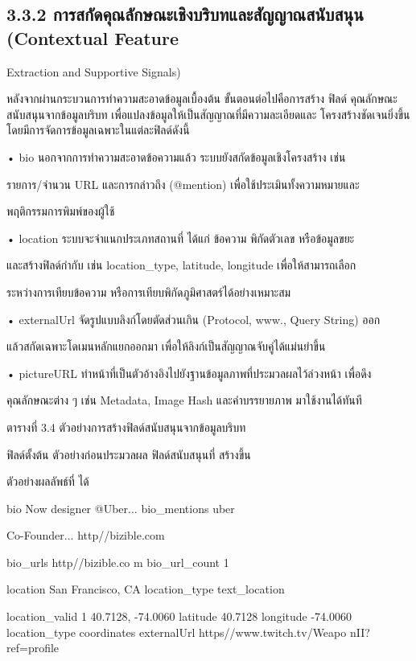 \documentclass[12pt,a4paper]{report}
\begin{document}
\subsection*{3.3.2 การสกัดคุณลักษณะเชิงบริบทและสัญญาณสนับสนุน (Contextual Feature}
Extraction and Supportive Signals)\par
หลังจากผ่านกระบวนการทำความสะอาดข้อมูลเบื้องต้น ขั้นตอนต่อไปคือการสร้าง ฟิลด์ คุณลักษณะสนับสนุนจากข้อมูลบริบท เพื่อแปลงข้อมูลให้เป็นสัญญาณที่มีความละเอียดและ โครงสร้างชัดเจนยิ่งขึ้น โดยมีการจัดการข้อมูลเฉพาะในแต่ละฟิลด์ดังนี้\par
\noindent • bio นอกจากการทำความสะอาดข้อความแล้ว ระบบยังสกัดข้อมูลเชิงโครงสร้าง เช่น\par
รายการ/จำนวน URL และการกล่าวถึง (@mention) เพื่อใช้ประเมินทั้งความหมายและ\par
พฤติกรรมการพิมพ์ของผู้ใช้\par
\noindent • location ระบบจะจำแนกประเภทสถานที่ ได้แก่ ข้อความ พิกัดตัวเลข หรือข้อมูลขยะ\par
และสร้างฟิลด์กำกับ เช่น location\_type, latitude, longitude เพื่อให้สามารถเลือก\par
ระหว่างการเทียบข้อความ หรือการเทียบพิกัดภูมิศาสตร์ได้อย่างเหมาะสม\par
\noindent • externalUrl จัดรูปแบบลิงก์โดยตัดส่วนเกิน (Protocol, www., Query String) ออก\par
แล้วสกัดเฉพาะโดเมนหลักแยกออกมา เพื่อให้ลิงก์เป็นสัญญาณจับคู่ได้แม่นยำขึ้น\par
\noindent • pictureURL ทำหน้าที่เป็นตัวอ้างอิงไปยังฐานข้อมูลภาพที่ประมวลผลไว้ล่วงหน้า เพื่อดึง\par
คุณลักษณะต่าง ๆ เช่น Metadata, Image Hash และคำบรรยายภาพ มาใช้งานได้ทันที\par
\begin{center}\small ตารางที่ 3.4 ตัวอย่างการสร้างฟิลด์สนับสนุนจากข้อมูลบริบท\end{center}
\clearpage
ฟิลด์ตั้งต้น ตัวอย่างก่อนประมวลผล ฟิลด์สนับสนุนที่ สร้างขึ้น\par
ตัวอย่างผลลัพธ์ที่ ได้\par
bio Now designer @Uber... bio\_mentions uber\par
Co-Founder... http//bizible.com\par
bio\_urls http//bizible.co m bio\_url\_count 1\par
location San Francisco, CA location\_type text\_location\par
location\_valid 1 40.7128, -74.0060 latitude 40.7128 longitude -74.0060 location\_type coordinates externalUrl https//www.twitch.tv/Weapo nII?ref=profile\par
\end{document}
